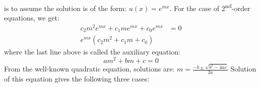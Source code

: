  is to assume the solution is of the form: $u(x)=e^{mx}$. For the case of 2\textsuperscript{nd}-order equations, we get:
\begin{align*}
c_2m^2e^{mx}+c_1me^{mx}+c_0e^{mx}&=0 \\
e^{mx}\left(c_2m^2+c_1m+c_0\right)
\end{align*}
\noindent where the last line above is called the auxiliary equation: 
\begin{equation}
am^2+bm+c = 0
\label{eq:aux-eqn}
\end{equation}
From the well-known quadratic equation, solutions are: $m = \frac{-b\pm\sqrt{b^2-4ac}}{2a}$
Solution of this equation gives the following three cases:
